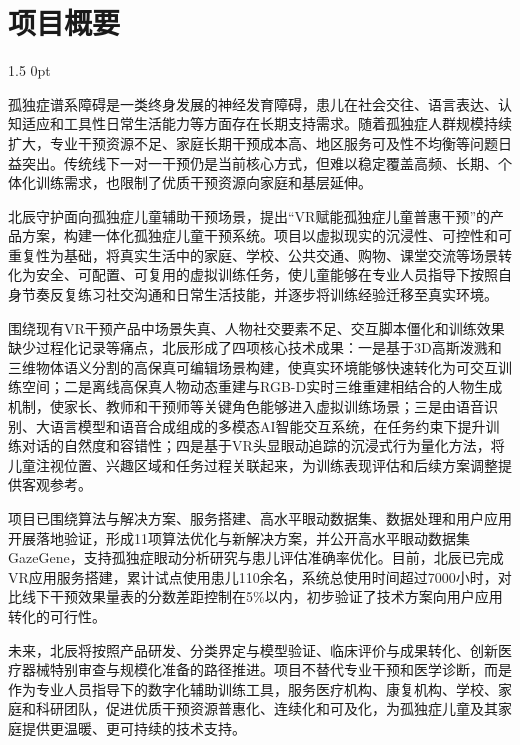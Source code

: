 \documentclass[zihao=-4]{ctexart}
\newcommand{\setParDis}{\setlength {\parskip} {0pt} }
\begin{document}
\section*{项目概要}
\begin{spacing}{1.5}
  \setParDis %

孤独症谱系障碍是一类终身发展的神经发育障碍，患儿在社会交往、语言表达、认知适应和工具性日常生活能力等方面存在长期支持需求。随着孤独症人群规模持续扩大，专业干预资源不足、家庭长期干预成本高、地区服务可及性不均衡等问题日益突出。传统线下一对一干预仍是当前核心方式，但难以稳定覆盖高频、长期、个体化训练需求，也限制了优质干预资源向家庭和基层延伸。

北辰守护面向孤独症儿童辅助干预场景，提出“VR赋能孤独症儿童普惠干预”的产品方案，构建一体化孤独症儿童干预系统。项目以虚拟现实的沉浸性、可控性和可重复性为基础，将真实生活中的家庭、学校、公共交通、购物、课堂交流等场景转化为安全、可配置、可复用的虚拟训练任务，使儿童能够在专业人员指导下按照自身节奏反复练习社交沟通和日常生活技能，并逐步将训练经验迁移至真实环境。

围绕现有VR干预产品中场景失真、人物社交要素不足、交互脚本僵化和训练效果缺少过程化记录等痛点，北辰形成了四项核心技术成果：一是基于3D高斯泼溅和三维物体语义分割的高保真可编辑场景构建，使真实环境能够快速转化为可交互训练空间；二是离线高保真人物动态重建与RGB-D实时三维重建相结合的人物生成机制，使家长、教师和干预师等关键角色能够进入虚拟训练场景；三是由语音识别、大语言模型和语音合成组成的多模态AI智能交互系统，在任务约束下提升训练对话的自然度和容错性；四是基于VR头显眼动追踪的沉浸式行为量化方法，将儿童注视位置、兴趣区域和任务过程关联起来，为训练表现评估和后续方案调整提供客观参考。

项目已围绕算法与解决方案、服务搭建、高水平眼动数据集、数据处理和用户应用开展落地验证，形成11项算法优化与新解决方案，并公开高水平眼动数据集GazeGene，支持孤独症眼动分析研究与患儿评估准确率优化。目前，北辰已完成VR应用服务搭建，累计试点使用患儿110余名，系统总使用时间超过7000小时，对比线下干预效果量表的分数差距控制在5\%以内，初步验证了技术方案向用户应用转化的可行性。

未来，北辰将按照产品研发、分类界定与模型验证、临床评价与成果转化、创新医疗器械特别审查与规模化准备的路径推进。项目不替代专业干预和医学诊断，而是作为专业人员指导下的数字化辅助训练工具，服务医疗机构、康复机构、学校、家庭和科研团队，促进优质干预资源普惠化、连续化和可及化，为孤独症儿童及其家庭提供更温暖、更可持续的技术支持。

\end{spacing}
\end{document}
